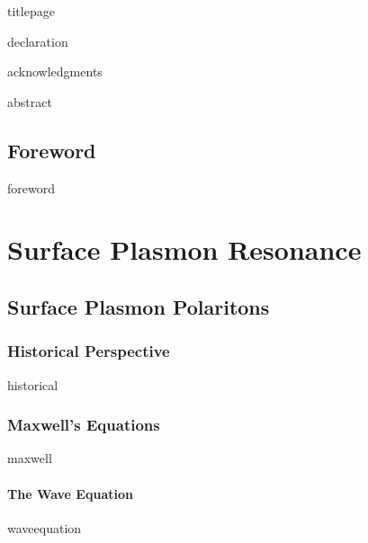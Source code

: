 \documentclass[a4paper,titlepage,onecolumn]{report}
\begin{document}
{titlepage}

{declaration}

{acknowledgments}

\tableofcontents

{abstract}



\chapter{Foreword} \label{ch:foreword}
{foreword}

\part{Surface Plasmon Resonance}
\chapter{Surface Plasmon Polaritons} \label{ch:existence}
 \section{Historical Perspective}
 {historical}
 \section{Maxwell's Equations}
 {maxwell}
  \subsection{The Wave Equation}
  {waveequation}
\end{document}
